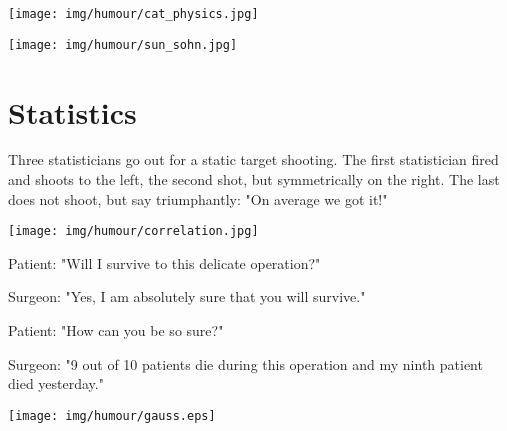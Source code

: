 	\begin{center}\underline{\hspace{5 cm}}\end{center}
	
	\begin{center}
	\texttt{[image: img/humour/cat\_physics.jpg]}
	\end{center}
	
	\begin{center}\underline{\hspace{5 cm}}\end{center}
	
	\begin{center}
	\texttt{[image: img/humour/sun\_sohn.jpg]}
	\end{center}
	

	\pagebreak
	\section{Statistics}

Three statisticians go out for a static target shooting. The first statistician fired and shoots to the left, the second shot, but symmetrically on the right. The last does not shoot, but say triumphantly: "On average we got it!"
\begin{center}\underline{\hspace{5 cm}}\end{center}
	\begin{center}
	\texttt{[image: img/humour/correlation.jpg]}
	\end{center}
\begin{center}\underline{\hspace{5 cm}}\end{center}

Patient: "Will I survive to this delicate operation?"

Surgeon: "Yes, I am absolutely sure that you will survive."

Patient: "How can you be so sure?"

Surgeon: "9 out of 10 patients die during this operation and my ninth patient died yesterday."
\begin{center}\underline{\hspace{5 cm}}\end{center}
	\begin{center}
	\texttt{[image: img/humour/gauss.eps]}
	\end{center}

